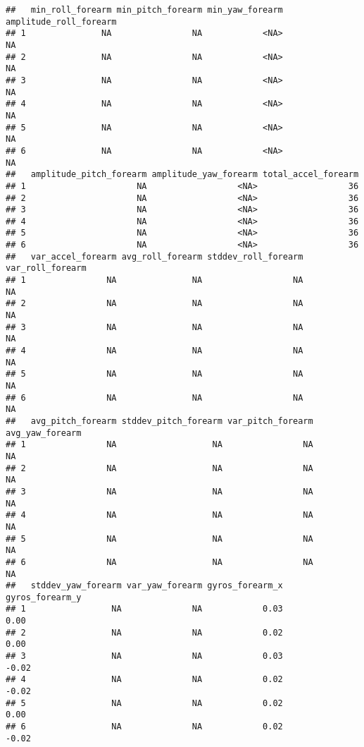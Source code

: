 \documentclass[
]{article}
\begin{document}
\begin{verbatim}
##   min_roll_forearm min_pitch_forearm min_yaw_forearm amplitude_roll_forearm
## 1               NA                NA            <NA>                     NA
## 2               NA                NA            <NA>                     NA
## 3               NA                NA            <NA>                     NA
## 4               NA                NA            <NA>                     NA
## 5               NA                NA            <NA>                     NA
## 6               NA                NA            <NA>                     NA
##   amplitude_pitch_forearm amplitude_yaw_forearm total_accel_forearm
## 1                      NA                  <NA>                  36
## 2                      NA                  <NA>                  36
## 3                      NA                  <NA>                  36
## 4                      NA                  <NA>                  36
## 5                      NA                  <NA>                  36
## 6                      NA                  <NA>                  36
##   var_accel_forearm avg_roll_forearm stddev_roll_forearm var_roll_forearm
## 1                NA               NA                  NA               NA
## 2                NA               NA                  NA               NA
## 3                NA               NA                  NA               NA
## 4                NA               NA                  NA               NA
## 5                NA               NA                  NA               NA
## 6                NA               NA                  NA               NA
##   avg_pitch_forearm stddev_pitch_forearm var_pitch_forearm avg_yaw_forearm
## 1                NA                   NA                NA              NA
## 2                NA                   NA                NA              NA
## 3                NA                   NA                NA              NA
## 4                NA                   NA                NA              NA
## 5                NA                   NA                NA              NA
## 6                NA                   NA                NA              NA
##   stddev_yaw_forearm var_yaw_forearm gyros_forearm_x gyros_forearm_y
## 1                 NA              NA            0.03            0.00
## 2                 NA              NA            0.02            0.00
## 3                 NA              NA            0.03           -0.02
## 4                 NA              NA            0.02           -0.02
## 5                 NA              NA            0.02            0.00
## 6                 NA              NA            0.02           -0.02

\end{verbatim}
\end{document}
